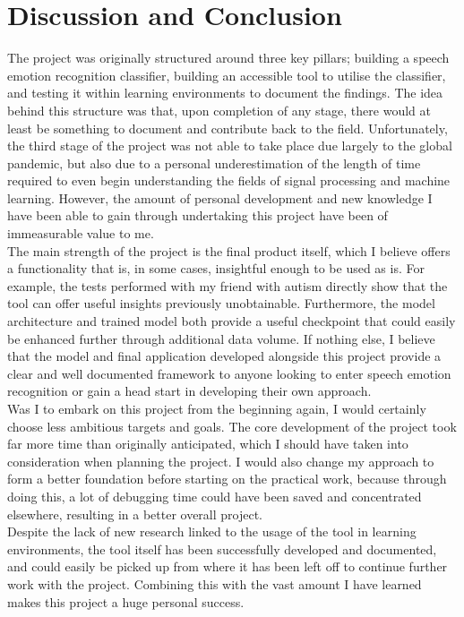 \documentclass[12pt]{article}
\begin{document}
\newpage
\section{Discussion and Conclusion}
The project was originally structured around three key pillars; building a speech emotion recognition classifier, building an accessible tool to utilise the classifier, and testing it within learning environments to document the findings. The idea behind this structure was that, upon completion of any stage, there would at least be something to document and contribute back to the field. Unfortunately, the third stage of the project was not able to take place due largely to the global pandemic, but also due to a personal underestimation of the length of time required to even begin understanding the fields of signal processing and machine learning. However, the amount of personal development and new knowledge I have been able to gain through undertaking this project have been of immeasurable value to me.
\\

\noindent The main strength of the project is the final product itself, which I believe offers a functionality that is, in some cases, insightful enough to be used as is. For example, the tests performed with my friend with autism directly show that the tool can offer useful insights previously unobtainable. Furthermore, the model architecture and trained model both provide a useful checkpoint that could easily be enhanced further through additional data volume. If nothing else, I believe that the model and final application developed alongside this project provide a clear and well documented framework to anyone looking to enter speech emotion recognition or gain a head start in developing their own approach. 
\\

\noindent Was I to embark on this project from the beginning again, I would certainly choose less ambitious targets and goals. The core development of the project took far more time than originally anticipated, which I should have taken into consideration when planning the project. I would also change my approach to form a better foundation before starting on the practical work, because through doing this, a lot of debugging time could have been saved and concentrated elsewhere, resulting in a better overall project. 
\\

\noindent Despite the lack of new research linked to the usage of the tool in learning environments, the tool itself has been successfully developed and documented, and could easily be picked up from where it has been left off to continue further work with the project. Combining this with the vast amount I have learned makes this project a huge personal success. 
\newpage
\end{document}
